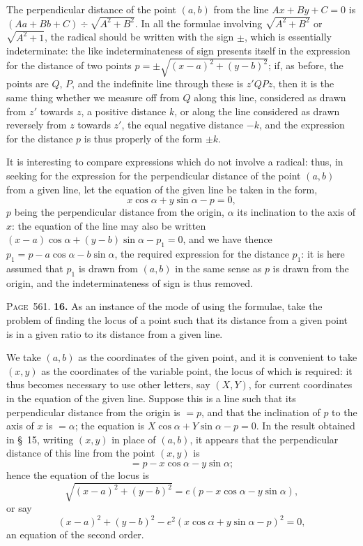\documentclass[11pt,a4paper]{article}
\theoremstyle{definition}
\begin{document}
The perpendicular distance of the point $(a,b)$ from the line $Ax+By+C=0$ is $(Aa+Bb+C)\div\sqrt{A^2+B^2}$. In all the formulae involving $\sqrt{A^2+B^2}$ or $\sqrt{A^2+1}$, the radical should be written with the sign $\pm$, which is essentially indeterminate: the like indeterminateness of sign presents itself in the expression for the distance of two points $p=\pm\sqrt{(x-a)^2+(y-b)^2}$; if, as before, the points are $Q$, $P$, and the indefinite line through these is $z'QPz$, then it is the same thing whether we measure off from $Q$ along this line, considered as drawn from $z'$ towards $z$, a positive distance $k$, or along the line considered as drawn reversely from $z$ towards $z'$, the equal negative distance $-k$, and the expression for the distance $p$ is thus properly of the form $\pm k$.

It is interesting to compare expressions which do not involve a radical: thus, in seeking for the expression for the perpendicular distance of the point $(a,b)$ from a given line, let the equation of the given line be taken in the form,
\[
x\cos\alpha + y\sin\alpha - p = 0,
\]
$p$ being the perpendicular distance from the origin, $\alpha$ its inclination to the axis of $x$: the equation of the line may also be written $(x-a)\cos\alpha+(y-b)\sin\alpha-p_1=0$, and we have thence $p_1=p-a\cos\alpha-b\sin\alpha$, the required expression for the distance $p_1$: it is here assumed that $p_1$ is drawn from $(a,b)$ in the same sense as $p$ is drawn from the origin, and the indeterminateness of sign is thus removed.

\newpage
\noindent\textsc{Page~561.} \textbf{16.} As an instance of the mode of using the formulae, take the problem of finding the locus of a point such that its distance from a given point is in a given ratio to its distance from a given line.

We take $(a,b)$ as the coordinates of the given point, and it is convenient to take $(x,y)$ as the coordinates of the variable point, the locus of which is required: it thus becomes necessary to use other letters, say $(X,Y)$, for current coordinates in the equation of the given line. Suppose this is a line such that its perpendicular distance from the origin is $=p$, and that the inclination of $p$ to the axis of $x$ is $=\alpha$; the equation is $X\cos\alpha+Y\sin\alpha-p=0$. In the result obtained in \S~15, writing $(x,y)$ in place of $(a,b)$, it appears that the perpendicular distance of this line from the point $(x,y)$ is
\[
=p-x\cos\alpha-y\sin\alpha;
\]
hence the equation of the locus is
\[
\sqrt{(x-a)^2+(y-b)^2} = e(p-x\cos\alpha-y\sin\alpha),
\]
or say
\[
(x-a)^2+(y-b)^2-e^2(x\cos\alpha+y\sin\alpha-p)^2=0,
\]
an equation of the second order.
\end{document}
